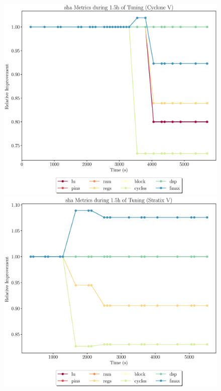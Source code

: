 \documentclass[12pt, a4paper]{article}
\begin{document}
\begin{figure}[htpb]
    \begin{minipage}{.48\textwidth}
        \includegraphics[scale=.29]{sha_all_5400_chstone_CycloneV}
    \end{minipage}%
    \hfill
    \begin{minipage}{.48\textwidth}
        \includegraphics[scale=.29]{sha_all_5400_chstone_StratixV}
    \end{minipage}%


\end{figure}
\end{document}
